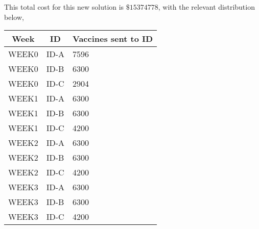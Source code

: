 \documentclass[12pt]{article}
\begin{document}
{    This total cost for this new solution is \(\$15374778\), with the relevant distribution below,
    \begin{center}
        \begin{table}[H]
            \begin{tabular}{|l|l|l|}
            \hline
            \multicolumn{1}{|c|}{\textbf{Week}} & \multicolumn{1}{c|}{\textbf{ID}} & \multicolumn{1}{c|}{\textbf{Vaccines sent to   ID}} \\ \hline
            WEEK0                               & ID-A                             & 7596                                                \\ \hline
            WEEK0                               & ID-B                             & 6300                                                \\ \hline
            WEEK0                               & ID-C                             & 2904                                                \\ \hline
            WEEK1                               & ID-A                             & 6300                                                \\ \hline
            WEEK1                               & ID-B                             & 6300                                                \\ \hline
            WEEK1                               & ID-C                             & 4200                                                \\ \hline
            WEEK2                               & ID-A                             & 6300                                                \\ \hline
            WEEK2                               & ID-B                             & 6300                                                \\ \hline
            WEEK2                               & ID-C                             & 4200                                                \\ \hline
            WEEK3                               & ID-A                             & 6300                                                \\ \hline
            WEEK3                               & ID-B                             & 6300                                                \\ \hline
            WEEK3                               & ID-C                             & 4200                                                \\ \hline

\end{tabular}
\end{table}
\end{center}}
\end{document}
